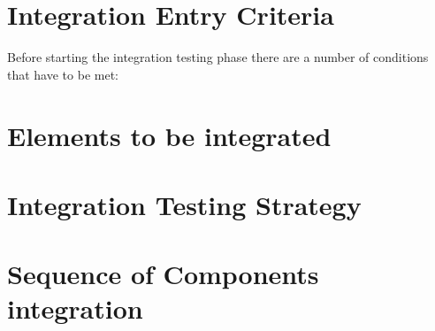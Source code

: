 \section{Integration Entry Criteria}
Before starting the integration testing phase there are a number of conditions that have to be met:

\section{Elements to be integrated}

\section{Integration Testing Strategy}

\section{Sequence of Components integration}


